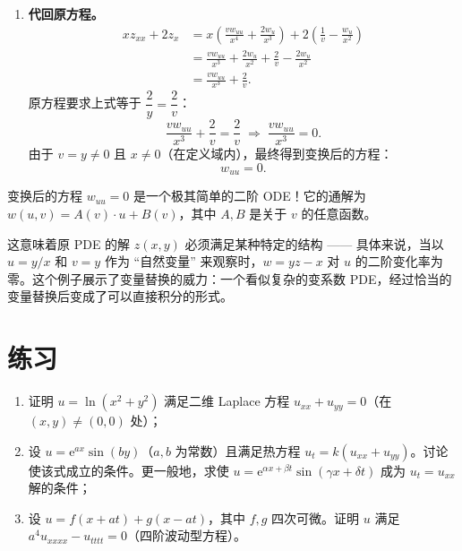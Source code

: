\documentclass[lang=cn,11pt]{elegantbook}
\begin{document}
\begin{solution}
\begin{enumerate}
  \item \textbf{代回原方程。}
  \begin{align*}
  xz_{xx}+2z_x
  &=x\!\left(\frac{vw_{uu}}{x^4}+\frac{2w_u}{x^3}\right)
  +2\!\left(\frac{1}{v}-\frac{w_u}{x^2}\right)\\[6pt]
  &=\frac{vw_{uu}}{x^3}+\frac{2w_u}{x^2}+\frac{2}{v}-\frac{2w_u}{x^2}\\[6pt]
  &=\frac{vw_{uu}}{x^3}+\frac{2}{v}.
  \end{align*}
  原方程要求上式等于 $\dfrac{2}{y}=\dfrac{2}{v}$：
  \[
  \frac{vw_{uu}}{x^3}+\frac{2}{v}=\frac{2}{v}
  \;\Longrightarrow\;
  \frac{vw_{uu}}{x^3}=0.
  \]
  由于 $v=y \neq 0$ 且 $x \neq 0$（在定义域内），最终得到变换后的方程：
  \[
  w_{uu}=0.
  \]
\end{enumerate}
\end{solution}

\begin{note}[结果的解读]
变换后的方程 $w_{uu}=0$ 是一个极其简单的二阶 ODE！它的通解为 $w(u,v)=A(v)\cdot u+B(v)$，其中 $A,B$ 是关于 $v$ 的任意函数。

这意味着原 PDE 的解 $z(x,y)$ 必须满足某种特定的结构 —— 具体来说，当以 $u=y/x$ 和 $v=y$ 作为 ``自然变量'' 来观察时，$w=yz-x$ 对 $u$ 的二阶变化率为零。这个例子展示了变量替换的威力：一个看似复杂的变系数 PDE，经过恰当的变量替换后变成了可以直接积分的形式。
\end{note}


\section{练习}

\begin{exercise}[PDE 验证]
\begin{enumerate}
  \item[(1)] 证明 $u=\ln(x^2+y^2)$ 满足二维 Laplace 方程 $u_{xx}+u_{yy}=0$（在 $(x,y) \neq (0,0)$ 处）；
  \item[(2)] 设 $u=\mathrm{e}^{ax}\sin(by)$（$a,b$ 为常数）且满足热方程 $u_t=k(u_{xx}+u_{yy})$。讨论使该式成立的条件。更一般地，求使 $u=\mathrm{e}^{\alpha x+\beta t}\sin(\gamma x+\delta t)$ 成为 $u_t=u_{xx}$ 解的条件；
  \item[(3)] 设 $u=f(x+at)+g(x-at)$，其中 $f,g$ 四次可微。证明 $u$ 满足 $a^4u_{xxxx}-u_{tttt}=0$（四阶波动型方程）。
\end{enumerate}
\end{exercise}
\end{document}
